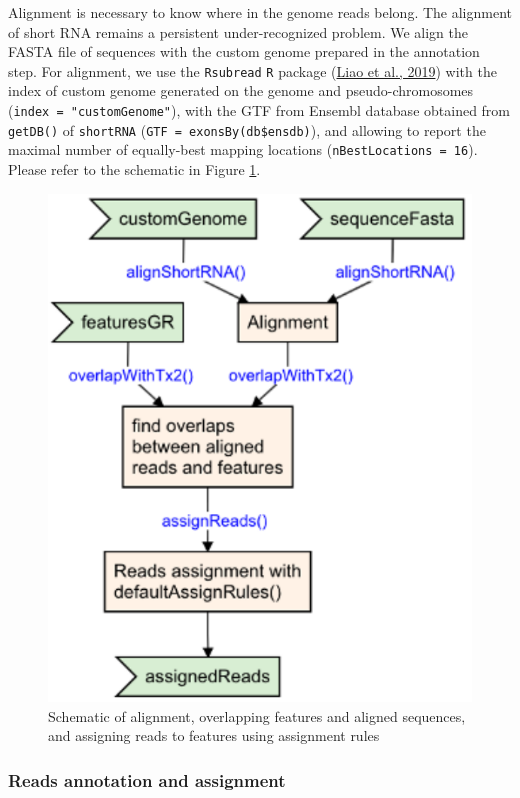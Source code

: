 \documentclass[12pt,twoside]{reedthesis}
\begin{document}
Alignment is necessary to know where in the genome reads belong. The
alignment of short RNA remains a persistent under-recognized problem. We
align the FASTA file of sequences with the custom genome prepared in the
annotation step. For alignment, we use the \texttt{Rsubread} \texttt{R} package
(\protect\hyperlink{ref-liao2019}{Liao et al., 2019}) with the index of custom genome generated on the genome and
pseudo-chromosomes (\texttt{index\ =\ "customGenome"}), with the GTF from Ensembl
database obtained from \texttt{getDB()} of \texttt{shortRNA}
(\texttt{GTF\ =\ exonsBy(db\$ensdb)}), and allowing to report the maximal number
of equally-best mapping locations (\texttt{nBestLocations\ =\ 16}). Please refer
to the schematic in Figure \ref{fig:3f7}.



\begin{figure}[htbp]

{\centering \includegraphics{thesis_files/figure-latex/3f7-1} 

}

\caption{Schematic of alignment, overlapping features and aligned
sequences, and assigning reads to features using assignment rules}\label{fig:3f7}
\end{figure}
\hypertarget{reads-annotation-and-assignment}{%
\subsubsection{Reads annotation and assignment}\label{reads-annotation-and-assignment}}
\end{document}
